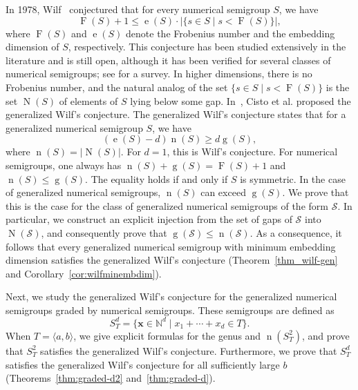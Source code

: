 \documentclass[12pt]{amsart}
\theoremstyle{plain}
\theoremstyle{theorem}
\theoremstyle{remark}
\begin{document}
In 1978, Wilf~\cite{Wilf1978} conjectured that for every numerical semigroup $S$, we have 
$$\operatorname{F}(S)+1\leq \operatorname{e}(S)\cdot
|\{s\in S\mid s<\operatorname{F}(S)\}|,$$
where $\operatorname{F}(S)$ and $\operatorname{e}(S)$ denote the Frobenius number and the embedding dimension of $S$, respectively. This conjecture has been studied extensively in the literature and is still open, although it has been verified for several classes of numerical semigroups; see \cite{DelgadoSurvey} for a survey. In higher dimensions, there is no Frobenius number, and the natural analog of the set $\{s\in S\mid s< \operatorname{F}(S)\}$ is the set $\operatorname{N}(S)$ of elements of $S$ lying below some gap. In~\cite{Cisto-et-al2020}, Cisto et al. proposed the generalized Wilf's conjecture. The generalized Wilf's conjecture states that for a generalized numerical semigroup $S$, we have 
$$(\operatorname{e}(S)-d)\operatorname{n}(S)\geq d \operatorname{g}(S),$$
where $\operatorname{n}(S)=|\operatorname{N}(S)|.$
For $d=1$, this is  Wilf's conjecture. For numerical semigroups, one always has $\operatorname{n}(S)+\operatorname{g}(S)=\operatorname{F}(S)+1$ and $\operatorname{n}(S)\leq \operatorname{g}(S)$. The equality holds if and only if $S$ is symmetric. In the case of generalized numerical semigroups, $\operatorname{n}(S)$ can exceed $\operatorname{g}(S)$. We prove that this is the case for the class of generalized numerical semigroups of the form $\mathcal{S}$. In particular, we construct an explicit injection from the set of gaps of $\mathcal{S}$ into $\operatorname{N}(\mathcal{S})$, and consequently prove that $\operatorname{g}(\mathcal{S})\leq \operatorname{n}(\mathcal{S}).$ As a consequence, it follows that every generalized numerical semigroup with minimum embedding dimension satisfies the generalized Wilf's conjecture (Theorem~\ref{thm_wilf-gen} and Corollary~\ref{cor:wilfminembdim}).

Next, we study the generalized Wilf's conjecture for the generalized numerical semigroups graded by numerical semigroups. These semigroups are defined as
 $$ S^d_T=\{\mathbf{x}\in\mathbb{N}^d\mid x_1+\cdots+x_d\in T\}.$$
When $T=\langle a,b\rangle$, we give explicit formulas for the genus and $\operatorname{n}(S^2_T)$, and prove that $S^2_T$ satisfies the generalized Wilf's conjecture. Furthermore, we prove that $S^d_T$ satisfies the generalized Wilf's conjecture for all sufficiently large $b$ (Theorems~\ref{thm:graded-d2} and~\ref{thm:graded-d}).
\end{document}
